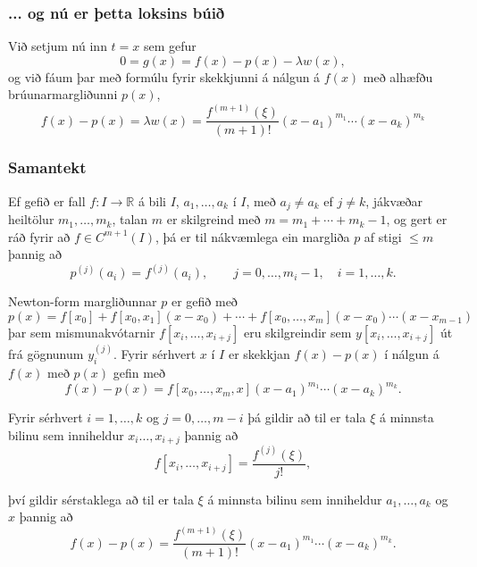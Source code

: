 \documentclass[icelandic,a4paper,12pt]{article}
\newcommand{\R}{{\mathbb  R}}
\begin{document}
\subsubsection{... og nú er þetta loksins búið} 
Við setjum nú inn $t=x$ sem gefur 
\begin{equation*}
0=g(x) = f(x) - p(x) - \lambda w(x),
\end{equation*}
og við fáum þar með formúlu fyrir skekkjunni á nálgun á $f(x)$
með alhæfðu brúunarmargliðunni $p(x)$, 
\begin{equation*}
f(x) - p(x) =\lambda w(x) = \dfrac{f^{(m+1)}(\xi)}{(m+1)!} 
(x-a_1)^{m_1} \cdots (x-a_k)^{m_k}
\end{equation*}


\subsubsection{Samantekt} 
Ef gefið er fall $f:I\to \R$ á bili $I$, $a_1,\dots,a_k$ í $I$, 
með $a_j\neq a_k$ ef $j\neq k$, jákvæðar heiltölur $m_1,\dots,m_k$,  
talan $m$ er skilgreind með $m=m_1+\cdots+m_k-1$, og gert er ráð fyrir
að $f\in C^{m+1}(I)$, þá er til nákvæmlega ein margliða $p$
af stigi $\leq m$ þannig að
$$
p^{(j)}(a_i)=f^{(j)}(a_i), \qquad j=0,\dots, m_i-1, \quad i=1,\dots,k. 
$$  
 

Newton-form margliðunnar $p$ er gefið með
$$
  p(x)=f[x_0]+f[x_0,x_1](x-x_0)+\cdots+f[x_0,\dots,x_m](x-x_0)\cdots(x-x_{m-1})
$$
þar sem mismunakvótarnir $f[x_i,\dots,x_{i+j}]$ eru skilgreindir sem
$y[x_i,\dots,x_{i+j}]$ út frá gögnunum $y^{(j)}_i$.  Fyrir sérhvert
$x$ í $I$ er skekkjan $f(x)-p(x)$ í nálgun á $f(x)$ með $p(x)$ gefin með
$$
  f(x)-p(x)=f[x_0,\dots,x_m,x](x-a_1)^{m_1}\cdots(x-a_k)^{m_k}.
$$

\pause
Fyrir sérhvert $i=1,\dots,k$ og $j=0,\dots,m-i$ þá gildir að til er
tala $\xi$ á minnsta bilinu sem inniheldur $x_i\dots,x_{i+j}$  þannig
að
$$
  f[x_i,\dots,x_{i+j}]=\dfrac{f^{(j)}(\xi)}{j!},
$$


því gildir sérstaklega að til er tala $\xi$ á minnsta bilinu sem
inniheldur $a_1,\dots,a_k$ og $x$ þannig að 
$$
f(x)-p(x)=\dfrac{f^{(m+1)}(\xi)}{(m+1)!}(x-a_1)^{m_1}\cdots(x-a_k)^{m_k}.
$$
\end{document}
